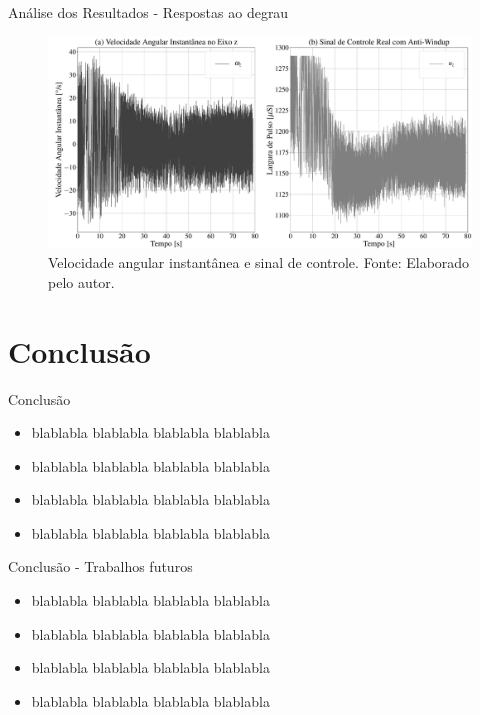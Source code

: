 \documentclass{beamer}
\begin{document}

\begin{frame}{Análise dos Resultados - Respostas ao degrau}
     \begin{figure}[HT]
		\begin{center}
		\captionsetup{justification=centering}
        \includegraphics[scale=.18]{../resultados/img/pid_result_controller}
        \caption{Velocidade angular instantânea e sinal de controle. \newline
        		 Fonte: Elaborado pelo autor.}
		\label{FIG_ADAPTATIVO}
        \end{center}
	\end{figure}
\end{frame}


\section{Conclusão}
	\begin{frame}{Conclusão}
    \begin{itemize}
        	\justifying
			\item blablabla blablabla blablabla blablabla
			\item blablabla blablabla blablabla blablabla 
			\item blablabla blablabla blablabla blablabla 
			\item blablabla blablabla blablabla blablabla 
		\end{itemize}
\end{frame}


\begin{frame}{Conclusão - Trabalhos futuros}
    \begin{itemize}
        \justifying
		\item blablabla blablabla blablabla blablabla 
		\item blablabla blablabla blablabla blablabla 
		\item blablabla blablabla blablabla blablabla 
		\item blablabla blablabla blablabla blablabla 
		\end{itemize}
\end{frame}
\end{document}
